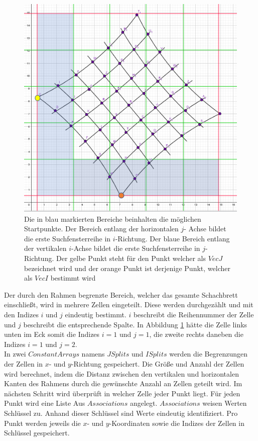 \begin{figure}[!htb]
	\centering
	\includegraphics[width=0.6\linewidth]{images/VerzeichnetesSchachbrett_1.png}
	\caption[Startpunktsuche in Schachbrettpunkten]{Die in blau markierten Bereiche beinhalten die möglichen Startpunkte. Der Bereich entlang der horizontalen $j$- Achse bildet die erste Suchfensterreihe in $i$-Richtung. Der blaue Bereich entlang der vertikalen $i$-Achse bildet die erste Suchfensterreihe in $j$-Richtung. Der gelbe Punkt steht für den Punkt welcher als $VecJ$ bezeichnet wird und der orange Punkt ist derjenige Punkt, welcher als $VecI$ bestimmt wird}
	\label{fig:7.1}
\end{figure}

Der durch den Rahmen begrenzte Bereich, welcher das gesamte Schachbrett einschließt, wird in mehrere Zellen eingeteilt. Diese werden durchgezählt und mit den Indizes $i$ und $j$ eindeutig bestimmt. $i$ beschreibt die Reihennummer der Zelle und $j$ beschreibt die entsprechende Spalte. In Abbildung \ref{fig:7.1} hätte die Zelle links unten im Eck somit die Indizes $i = 1$ und $j = 1$, die zweite rechts daneben die Indizes $i = 1$ und $j= 2$.\\

In zwei $ConstantArrays$ namens $JSplits$ und $ISplits$ werden die Begrenzungen der Zellen  in $x$- und $y$-Richtung gespeichert. Die Größe und Anzahl der Zellen wird berechnet, indem die Distanz zwischen den vertikalen und horizontalen Kanten des Rahmens durch die gewünschte Anzahl an Zellen geteilt wird. Im nächsten Schritt wird überprüft in welcher Zelle jeder Punkt liegt. Für jeden Punkt wird eine Liste Aus $Associations$ angelegt.  $Associations$ weisen Werten Schlüssel zu. Anhand dieser Schlüssel sind Werte eindeutig identifiziert\cite{Mathematica}. Pro Punkt werden jeweils die $x$- und $y$-Koordinaten sowie die Indizes der Zellen in Schlüssel gespeichert.

